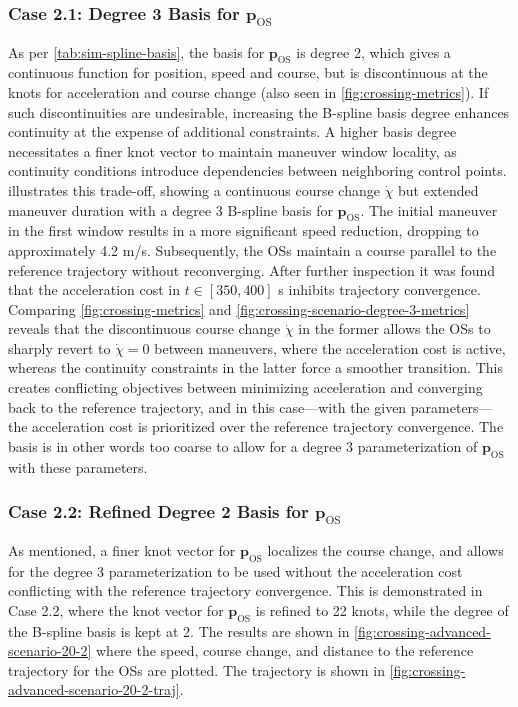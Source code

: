 \subsubsection{Case 2.1: Degree 3 Basis for $\mathbf p_\text{OS}$}
As per \cref{tab:sim-spline-basis}, the basis for $\mathbf p_\text{OS}$ is degree 2, which gives a continuous function for position, speed and course, but is discontinuous at the knots for acceleration and course change (also seen in \cref{fig:crossing-metrics}). 
If such discontinuities are undesirable, increasing the B-spline basis degree enhances continuity at the expense of additional constraints. A higher basis degree necessitates a finer knot vector to maintain maneuver window locality, as continuity conditions introduce dependencies between neighboring control points.  illustrates this trade-off, showing a continuous course change $\dot\chi$ but extended maneuver duration with a degree 3 B-spline basis for $\mathbf p_\text{OS}$. 
The initial maneuver in the first window results in a more significant speed reduction, dropping to approximately 4.2 m/s. Subsequently, the OSs maintain a course parallel to the reference trajectory without reconverging. After further inspection it was found that the acceleration cost in $t\in[350, 400]$ s inhibits trajectory convergence. 
Comparing \cref{fig:crossing-metrics} and \cref{fig:crossing-scenario-degree-3-metrics} reveals that the discontinuous course change $\dot{\chi}$ in the former allows the OSs to sharply revert to $\dot{\chi}=0$ between maneuvers, where the acceleration cost is active, whereas the continuity constraints in the latter force a smoother transition. This creates conflicting objectives between minimizing acceleration and converging back to the reference trajectory, and in this case---with the given parameters---the acceleration cost is prioritized over the reference trajectory convergence. The basis is in other words too coarse to allow for a degree 3 parameterization of $\mathbf p_\text{OS}$ with these parameters.

\subsubsection{Case 2.2: Refined Degree 2 Basis for $\mathbf p_\text{OS}$}
As mentioned, a finer knot vector for $\mathbf p_\text{OS}$ localizes the course change, and allows for the degree 3 parameterization to be used without the acceleration cost conflicting with the reference trajectory convergence. This is demonstrated in Case 2.2, where the knot vector for $\mathbf p_\text{OS}$ is refined to 22 knots, while the degree of the B-spline basis is kept at 2. The results are shown in \cref{fig:crossing-advanced-scenario-20-2} where the speed, course change, and distance to the reference trajectory for the OSs are plotted. The trajectory is shown in \cref{fig:crossing-advanced-scenario-20-2-traj}. 

